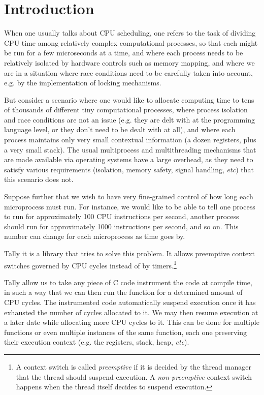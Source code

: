 \documentclass[12pt,a4paper]{report}
\begin{document}
\clearpage
\chapter{Introduction}
When one usually talks about CPU scheduling, one refers to the task of dividing CPU time among relatively complex computational processes, so that each might be run for a few microseconds at a time, and where each process needs to be relatively isolated by hardware controls such as memory mapping, and where we are in a situation where race conditions need to be carefully taken into account, e.g. by the implementation of locking mechanisms.

But consider a scenario where one would like to allocate computing time to tens of thousands of different tiny computational processes, where process isolation and race conditions are not an issue (e.g. they are delt with at the programming language level, or they don't need to be dealt with at all), and where each process maintains only very small contextual information (a dozen registers, plus a very small stack). The usual multiprocess and multithreading mechanisms that are made available via operating systems have a large overhead, as they need to satisfy various requirements (isolation, memory safety, signal handling, \textit{etc}) that this scenario does not.

Suppose further that we wish to have very fine-grained control of how long each microprocess must run. For instance, we would like to be able to tell one process to run for approximately 100 CPU instructions per second, another process should run for approximately 1000 instructions per second, and so on. This number can change for each microprocess as time goes by.

Tally it is a library that tries to solve this problem. It allows preemptive context switches governed by CPU cycles instead of by timers.\footnote{A context switch is called \textit{preemptive} if it is decided by the thread manager that the thread should suspend execution. A \textit{non-preemptive} context switch happens when the thread itself decides to suspend execution.}

Tally allow us to take any piece of C code instrument the code at compile time, in such a way that we can then run the function for a determined amount of CPU cycles. The instrumented code automatically suspend execution once it has exhausted the number of cycles allocated to it. We may then resume execution at a later date while allocating more CPU cycles to it. This can be done for multiple functions or even multiple instances of the same function, each one preserving their execution context (e.g. the registers, stack, heap, \textit{etc}).
\end{document}
